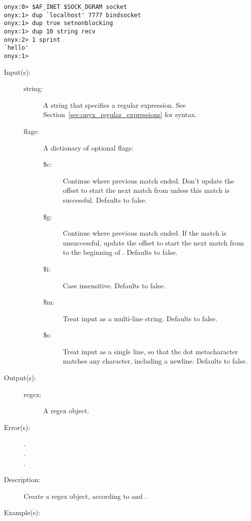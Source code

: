 \begin{description}
\begin{description}
\begin{verbatim}
onyx:0> $AF_INET $SOCK_DGRAM socket
onyx:1> dup `localhost' 7777 bindsocket
onyx:1> dup true setnonblocking
onyx:1> dup 10 string recv
onyx:2> 1 sprint
`hello'
onyx:1>
		\end{verbatim}
	\end{description}
\label{systemdict:regex}
\item[{\onyxop{string flags}{regex}{regex}}: ]
\item[{\onyxop{string}{regex}{regex}}: ]
	\begin{description}\item[]
	\item[Input(s): ]
		\begin{description}\item[]
		\item[string: ]
			A string that specifies a regular expression.  See
			Section~\ref{sec:onyx_regular_expressions} for syntax.
		\item[flags: ]
			A dictionary of optional flags:
			\begin{description}%
			\item[\$c: ]
				Continue where previous match ended.  Don't
				update the offset to start the next match from
				unless this match is successful.  Defaults to
				false.
			\item[\$g: ]
				Continue where previous match ended.  If the
				match is unsuccessful, update the offset to
				start the next match from to the beginning of
				.  Defaults to false.
			\item[\$i: ] Case insensitive.  Defaults to false.
			\item[\$m: ] Treat input as a multi-line string.
				Defaults to false.
			\item[\$s: ] Treat input as a single line, so that
				the dot metacharacter matches any character,
				including a newline.  Defaults to false.
			\end{description}
		\end{description}
	\item[Output(s): ]
		\begin{description}\item[]
		\item[regex: ]
			A regex object.
		\end{description}
	\item[Error(s): ]
		\begin{description}\item[]
		\item[.]
		\item[.]
		\item[.]
		\end{description}
	\item[Description: ]
		Create a regex object, according to  and
		.
	\item[Example(s): ]\begin{verbatim}


\end{verbatim}
\end{description}
\end{description}
